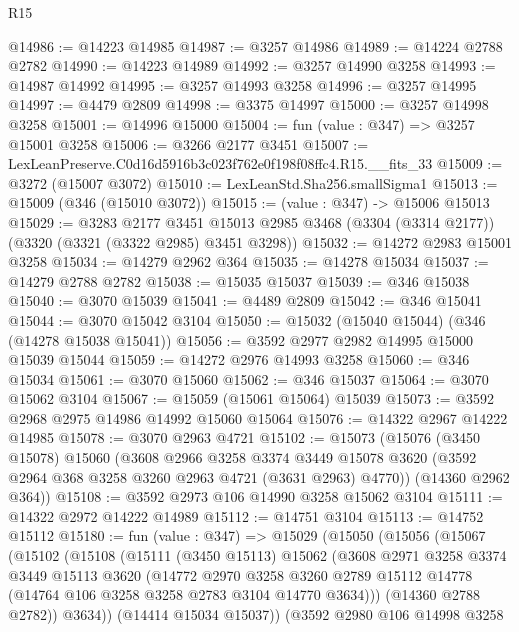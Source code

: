 \begin{lexlean}{R15}
\begin{coremodule}
@14986 := @14223 @14985
@14987 := @3257 @14986
@14989 := @14224 @2788 @2782
@14990 := @14223 @14989
@14992 := @3257 @14990 @3258
@14993 := @14987 @14992
@14995 := @3257 @14993 @3258
@14996 := @3257 @14995
@14997 := @4479 @2809
@14998 := @3375 @14997
@15000 := @3257 @14998 @3258
@15001 := @14996 @15000
@15004 := fun (value : @347) => @3257 @15001 @3258
@15006 := @3266 @2177 @3451
@15007 := LexLeanPreserve.C0d16d5916b3c023f762e0f198f08ffc4.R15.__fits_33
@15009 := @3272 (@15007 @3072)
@15010 := LexLeanStd.Sha256.smallSigma1
@15013 := @15009 (@346 (@15010 @3072))
@15015 := (value : @347) -> @15006 @15013
@15029 := @3283
    @2177
    @3451
    @15013
    @2985
    @3468
    (@3304 (@3314 @2177))
    (@3320 (@3321 (@3322 @2985) @3451 @3298))
@15032 := @14272 @2983 @15001 @3258
@15034 := @14279 @2962 @364
@15035 := @14278 @15034
@15037 := @14279 @2788 @2782
@15038 := @15035 @15037
@15039 := @346 @15038
@15040 := @3070 @15039
@15041 := @4489 @2809
@15042 := @346 @15041
@15044 := @3070 @15042 @3104
@15050 := @15032 (@15040 @15044) (@346 (@14278 @15038 @15041))
@15056 := @3592 @2977 @2982 @14995 @15000 @15039 @15044
@15059 := @14272 @2976 @14993 @3258
@15060 := @346 @15034
@15061 := @3070 @15060
@15062 := @346 @15037
@15064 := @3070 @15062 @3104
@15067 := @15059 (@15061 @15064) @15039
@15073 := @3592 @2968 @2975 @14986 @14992 @15060 @15064
@15076 := @14322 @2967 @14222 @14985
@15078 := @3070 @2963 @4721
@15102 := @15073
    (@15076
      (@3450 @15078)
      @15060
      (@3608
        @2966
        @3258
        @3374
        @3449
        @15078
        @3620
        (@3592 @2964 @368 @3258 @3260 @2963 @4721 (@3631 @2963) @4770))
      (@14360 @2962 @364))
@15108 := @3592 @2973 @106 @14990 @3258 @15062 @3104
@15111 := @14322 @2972 @14222 @14989
@15112 := @14751 @3104
@15113 := @14752 @15112
@15180 := fun (value : @347) =>
  @15029
    (@15050
      (@15056
        (@15067
          (@15102
            (@15108
              (@15111
                (@3450 @15113)
                @15062
                (@3608
                  @2971
                  @3258
                  @3374
                  @3449
                  @15113
                  @3620
                  (@14772
                    @2970
                    @3258
                    @3260
                    @2789
                    @15112
                    @14778
                    (@14764 @106 @3258 @3258 @2783 @3104 @14770 @3634)))
                (@14360 @2788 @2782))
              @3634))
          (@14414 @15034 @15037))
        (@3592
          @2980
          @106
          @14998
          @3258

\end{coremodule}
\end{lexlean}
